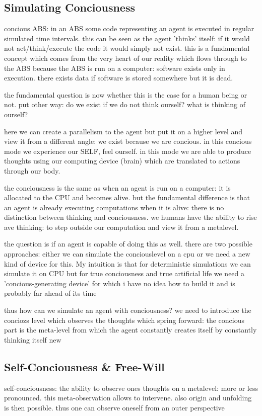 \subsection{Simulating Conciousness}
concious ABS: in an ABS some code representing an agent is executed in regular simulated time intervals. this can be seen as the agent 'thinks' itself: if it would not act/think/execute the code it would simply not exist. this is a fundamental concept which comes from the very heart of our reality which flows through to the ABS because the ABS is run on a computer: software exists only in execution. there exists data if software is stored somewhere but it is dead.

the fundamental question is now whether this is the case for a human being or not. put other way: do we exist if we do not think ourself? what is thinking of ourself?

here we can create a parallelism to the agent but put it on a higher level and view it from a different angle: we exist because we are concious. in this concious mode we experience our SELF, feel ourself. in this mode we are able to produce thoughts using our computing device (brain) which are translated to actions through our body.

the conciousness is the same as when an agent is run on a computer: it is allocated to the CPU and becomes alive. but the fundamental difference is that an agent is already executing computations when it is alive: there is no distinction between thinking and conciousness. we humans have the ability to rise ave thinking: to step outside our computation and view it from a metalevel. 

the question is if an agent is capable of doing this as well. there are two possible approaches: either we can simulate the conciouslevel on a cpu or we need a new kind of device for this. My intuition is that for deterministic simulations we can simulate it on CPU but for true conciousness and true artificial life we need a 'concious-generating device' for which i have no idea how to build it and is probably far ahead of its time

thus how can we simulate an agent with conciousness? we need to introduce the conciozs level which observes the thoughts which spring forward: the concious part is the meta-level from which the agent constantly creates itself by constantly thinking itself new 

\subsection{Self-Conciousness \& Free-Will}
self-conciousness: the ability to observe ones thoughts on a metalevel: more or less pronounced. this meta-observation allows to intervene. also origin and unfolding is then possible. thus one can observe oneself from an outer perspective \\

